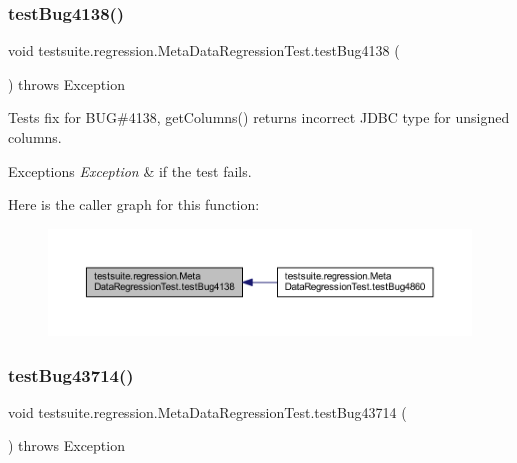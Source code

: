 \subsubsection{\texorpdfstring{test\+Bug4138()}{testBug4138()}}
{\footnotesize\ttfamily void testsuite.\+regression.\+Meta\+Data\+Regression\+Test.\+test\+Bug4138 (\begin{DoxyParamCaption}{ }\end{DoxyParamCaption}) throws Exception}

Tests fix for B\+UG\#4138, get\+Columns() returns incorrect J\+D\+BC type for unsigned columns.


\begin{DoxyExceptions}{Exceptions}
{\em Exception} & if the test fails. \\
\hline
\end{DoxyExceptions}
Here is the caller graph for this function\+:
\nopagebreak
\begin{figure}[H]
\begin{center}
\leavevmode
\includegraphics[width=350pt]{classtestsuite_1_1regression_1_1_meta_data_regression_test_a5c0ea954c7204a811055ea0487e75862_icgraph}
\end{center}
\end{figure}
\mbox{\label{classtestsuite_1_1regression_1_1_meta_data_regression_test_ab951e6884bbb864b56804cdbb096b57d}} 
\subsubsection{\texorpdfstring{test\+Bug43714()}{testBug43714()}}
{\footnotesize\ttfamily void testsuite.\+regression.\+Meta\+Data\+Regression\+Test.\+test\+Bug43714 (\begin{DoxyParamCaption}{ }\end{DoxyParamCaption}) throws Exception}

